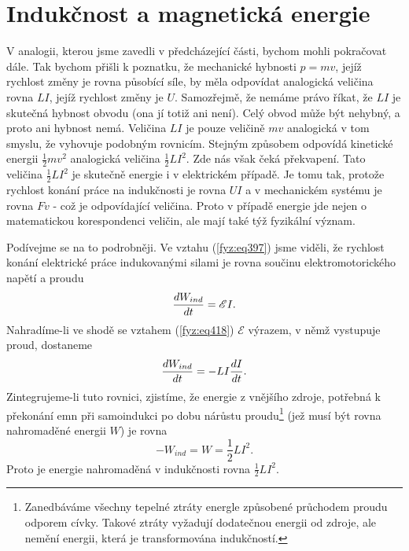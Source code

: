 {\section{Indukčnost a magnetická energie}\label{fyz:IIchapXVIIsecVIII}
  V analogii, kterou jsme zavedli v předcházející části, bychom mohli pokračovat dále. Tak bychom 
  přišli k poznatku, že mechanické hybnosti \(p=mv\), jejíž rychlost změny je rovna působící síle, 
  by měla odpovídat analogická veličina rovna \(LI\), jejíž rychlost změny je \(U\). Samozřejmě, že 
  nemáme právo říkat, že \(LI\) je skutečná hybnost obvodu (ona jí totiž ani není). Celý obvod může
  být nehybný, a proto ani hybnost nemá. Veličina \(LI\) je pouze veličině \(mv\) analogická v tom 
  smyslu, že vyhovuje podobným rovnicím. Stejným způsobem odpovídá kinetické energii 
  \(\frac{1}{2}mv^2\) analogická veličina \(\frac{1}{2}LI^2\). Zde nás však čeká překvapení. Tato 
  veličina \(\frac{1}{2}LI^2\) je skutečně energie i v elektrickém případě. Je tomu tak, protože 
  rychlost konání práce na indukčnosti je rovna \(UI\) a v mechanickém systému je rovna \(Fv\) - 
  což je odpovídající veličina. Proto v případě energie jde nejen o matematickou korespondenci 
  veličin, ale mají také týž fyzikální význam. 

  Podívejme se na to podrobněji. Ve vztahu (\ref{fyz:eq397}) jsme viděli, že rychlost konání 
  elektrické práce indukovanými silami je rovna součinu elektromotorického napětí a proudu
  \begin{equation*}
    \dfrac{d W_{ind}}{d t} = \mathscr{E}I.
  \end{equation*}
  Nahradíme-li ve shodě se vztahem (\ref{fyz:eq418}) \(\mathscr{E}\) výrazem, v němž vystupuje 
  proud, dostaneme
  \begin{equation}\label{fyz:eq420}
    \dfrac{d W_{ind}}{d t} = -LI\dfrac{d I}{d t}.
  \end{equation}
  Zintegrujeme-li tuto rovnici, zjistíme, že energie z vnějšího zdroje, potřebná k překonání emn 
  při samoindukci po dobu nárůstu proudu\footnote{Zanedbáváme všechny tepelné ztráty energle 
  způsobené průchodem proudu odporem cívky. Takové ztráty vyžadují dodatečnou energii od zdroje, 
  ale nemění energii, která je transformována indukčností.} (jež musí být rovna nahromaděné energii 
  \(W\)) je rovna
  \begin{equation}\label{fyz:eq421}
     - W_{ind} = W = \frac{1}{2}LI^2.
  \end{equation}
  Proto je energie nahromaděná v indukčnosti rovna \(\frac{1}{2}LI^2\).
  
}
